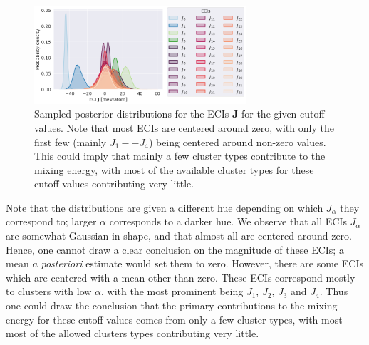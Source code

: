 \documentclass[11pt,a4paper]{article}
\begin{document}
\begin{figure}[ht]
    \centering
    \includegraphics[width=0.7\textwidth]{figures/task4_ecis.png}
    \caption{Sampled posterior distributions for the ECIs $\mathbf{J}$ for the given cutoff values. Note that most ECIs are centered around zero, with only the first few (mainly $J_1--J_4$) being centered around non-zero values. This could imply that mainly a few cluster types contribute to the mixing energy, with most of the available cluster types for these cutoff values contributing very little.}
    \label{fig:bayes_eci}
\end{figure}
Note that the distributions are given a different hue depending on which $J_\alpha$ they correspond to; larger $\alpha$ corresponds to a darker hue. We observe that all ECIs $J_\alpha$ are somewhat Gaussian in shape, and that almost all are centered around zero. Hence, one cannot draw a clear conclusion on the magnitude of these ECIs; a mean \textit{a posteriori} estimate would set them to zero. However, there are some ECIs which are centered with a mean other than zero. These ECIs correspond mostly to clusters with low $\alpha$, with the most prominent being $J_1$, $J_2$, $J_3$ and $J_4$. Thus one could draw the conclusion that the primary contributions to the mixing energy for these cutoff values comes from only a few cluster types, with most most of the allowed clusters types contributing very little. 
\end{document}
